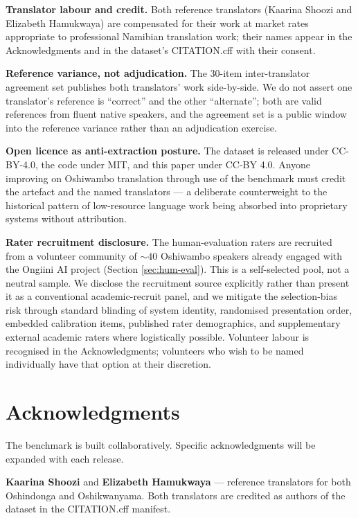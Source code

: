 \documentclass[11pt]{article}
\begin{document}
\textbf{Translator labour and credit.} Both reference translators
(Kaarina Shoozi and Elizabeth Hamukwaya) are compensated for their
work at market rates appropriate to professional Namibian
translation work; their names appear in the Acknowledgments and in
the dataset's CITATION.cff with their consent.

\textbf{Reference variance, not adjudication.} The 30-item
inter-translator agreement set publishes both translators' work
side-by-side. We do not assert one translator's reference is
``correct'' and the other ``alternate''; both are valid references
from fluent native speakers, and the agreement set is a public
window into the reference variance rather than an adjudication
exercise.

\textbf{Open licence as anti-extraction posture.} The dataset is
released under CC-BY-4.0, the code under MIT, and this paper under
CC-BY 4.0. Anyone improving on Oshiwambo translation through use of
the benchmark must credit the artefact and the named translators ---
a deliberate counterweight to the historical pattern of
low-resource language work being absorbed into proprietary systems
without attribution.

\textbf{Rater recruitment disclosure.} The human-evaluation raters
are recruited from a volunteer community of $\sim 40$ Oshiwambo
speakers already engaged with the Ongiini AI project (Section
\ref{sec:hum-eval}). This is a self-selected pool, not a neutral
sample. We disclose the recruitment source explicitly rather than
present it as a conventional academic-recruit panel, and we
mitigate the selection-bias risk through standard blinding of
system identity, randomised presentation order, embedded
calibration items, published rater demographics, and supplementary
external academic raters where logistically possible. Volunteer
labour is recognised in the Acknowledgments; volunteers who wish
to be named individually have that option at their discretion.

\section*{Acknowledgments}

The benchmark is built collaboratively. Specific acknowledgments
will be expanded with each release.

\textbf{Kaarina Shoozi} and \textbf{Elizabeth Hamukwaya} ---
reference translators for both Oshindonga and Oshikwanyama. Both
translators are credited as authors of the dataset in the
CITATION.cff manifest.
\end{document}
